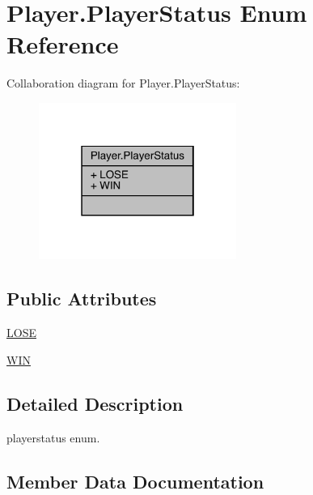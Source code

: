 \hypertarget{enum_player_1_1_player_status}{}\section{Player.\+Player\+Status Enum Reference}
\label{enum_player_1_1_player_status}


Collaboration diagram for Player.\+Player\+Status\+:
\nopagebreak
\begin{figure}[H]
\begin{center}
\leavevmode
\includegraphics[width=183pt]{enum_player_1_1_player_status__coll__graph}
\end{center}
\end{figure}
\subsection*{Public Attributes}
\begin{DoxyCompactItemize}
\item 
\mbox{\hyperlink{enum_player_1_1_player_status_a221d8c70ce45a610cf230aedf5c568eb}{L\+O\+SE}}
\item 
\mbox{\hyperlink{enum_player_1_1_player_status_ae166cfbd33fea069302af235a51953b8}{W\+IN}}
\end{DoxyCompactItemize}


\subsection{Detailed Description}
playerstatus enum. 

\subsection{Member Data Documentation}
\mbox{\label{enum_player_1_1_player_status_a221d8c70ce45a610cf230aedf5c568eb}} 
